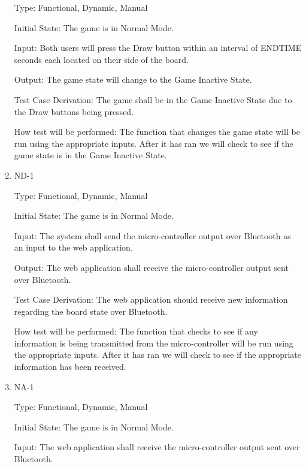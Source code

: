 \documentclass[12pt, titlepage]{article}
\begin{document}
\begin{enumerate}
      Type: Functional, Dynamic, Manual
                        
      Initial State: The game is in Normal Mode.
                          
      Input: Both users will press the Draw button within an interval of ENDTIME seconds each located on their side of the board.
                          
      Output: The game state will change to the Game Inactive State.
                          
      Test Case Derivation: The game shall be in the Game Inactive State due to the Draw buttons being pressed.
      
      How test will be performed: The function that changes the game state will be run using the appropriate inputs.
      After it has ran we will check to see if the game state is in the Game Inactive State.
  
      \item{ND-1\\}
  
      Type: Functional, Dynamic, Manual
                        
      Initial State: The game is in Normal Mode.
                          
      Input: The system shall send the micro-controller output over Bluetooth as an input to the web application.
                          
      Output: The web application shall receive the micro-controller output sent over Bluetooth.
                          
      Test Case Derivation: The web application should receive new information regarding the board state over Bluetooth. 
  
      How test will be performed: The function that checks to see if any information is being transmitted from the micro-controller
      will be run using the appropriate inputs. After it has ran we will check to see if the appropriate information has been received.
  
      \item{NA-1\\}
  
      Type: Functional, Dynamic, Manual
                        
      Initial State: The game is in Normal Mode.
                          
      Input: The web application shall receive the micro-controller output sent over Bluetooth.
                          

\end{enumerate}
\end{document}
